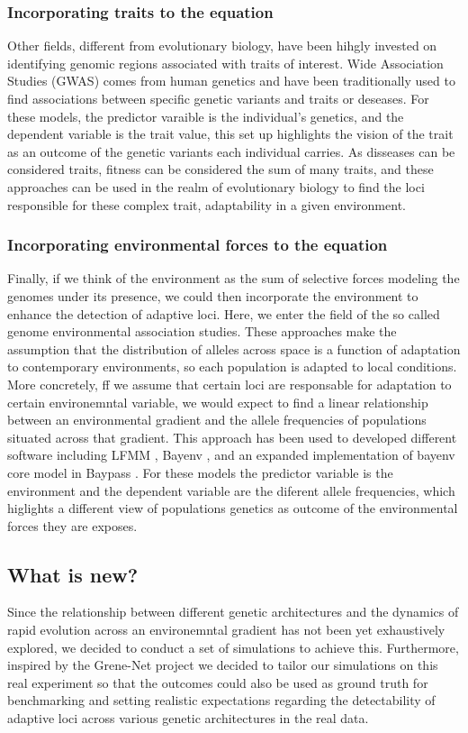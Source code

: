 \documentclass{article}
\begin{document}
\subsubsection{Incorporating traits to the equation} 
Other fields, different from evolutionary biology, have been hihgly invested on identifying genomic regions associated with traits of interest. Wide Association Studies (GWAS) comes from human genetics and have been traditionally used  to find associations between specific genetic variants and traits or deseases. For these models, the predictor varaible is the individual's genetics, and the dependent variable is the trait value, this set up highlights the vision of the trait as an outcome of the genetic variants each individual carries. As disseases can be considered traits, fitness can be considered the sum of many traits, and these approaches can be used in the realm of evolutionary biology to find the loci responsible for these complex trait, adaptability in a given environment. 

\subsubsection{Incorporating environmental forces to the equation}
Finally, if we think of the environment as the sum of selective forces modeling the genomes under its presence, we could then incorporate the environment to enhance the detection of adaptive loci. Here, we enter the field of the so called genome environmental association studies. These approaches make the assumption that the distribution of alleles across space is a function of adaptation to contemporary environments, so each population is adapted to local conditions. More concretely, ff we assume that certain loci are responsable for adaptation to certain environemntal variable, we would expect to find a linear relationship between an environmental gradient and the allele frequencies of populations situated across that gradient. This approach has been used to developed different software including LFMM \citep{Frichot2013-mg}, Bayenv \citep{Gunther2013-fw}, and an expanded implementation of bayenv core model in Baypass \citep{Gautier2015-lp}. For these models the predictor variable is the environment and the dependent variable are the diferent allele frequencies, which higlights a different view of populations genetics as outcome of the environmental forces they are exposes.

\subsection{What is new?}
Since the relationship between different genetic architectures and the dynamics of rapid evolution across an environemntal gradient has not been yet exhaustively explored, we decided to conduct a set of simulations to achieve this. Furthermore, inspired by the Grene-Net project we decided to tailor our simulations on this real experiment so that the outcomes could also be used as ground truth for benchmarking and setting realistic expectations regarding the detectability of adaptive loci across various genetic architectures in the real data. 
\end{document}
